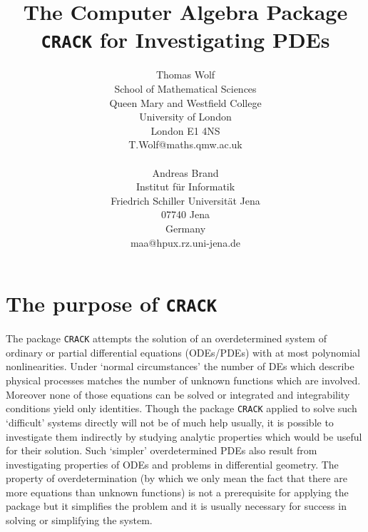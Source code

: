
\oddsidemargin 10mm  \evensidemargin 10mm
\topmargin 0pt   \headheight 0pt   \headsep 0pt
\footheight 14pt  \footskip 40pt
\textheight 23cm  \textwidth 15cm
 



\title{The Computer Algebra Package {\tt CRACK} for Investigating PDEs}
\author{Thomas Wolf \\                        
        School of Mathematical Sciences \\
        Queen Mary and Westfield College \\
        University of London \\
        London E1 4NS \\
        T.Wolf@maths.qmw.ac.uk
\\ \\
Andreas Brand \\ Institut f\"{u}r 
Informatik \\ Friedrich Schiller Universit\"{a}t Jena \\ 07740 Jena
\\ Germany \\ maa@hpux.rz.uni-jena.de
}


\maketitle
\tableofcontents                                  
\section{The purpose of {\tt CRACK}}
The package {\tt CRACK} attempts the solution of an overdetermined 
system of ordinary or partial differential
equations (ODEs/PDEs) with at most polynomial nonlinearities. 
Under `normal circumstances' the number of DEs which describe physical
processes matches the number of unknown functions which are involved.
Moreover none of those equations can be solved or integrated and
integrability conditions yield only identities.  Though the package
{\tt CRACK} applied to solve such `difficult' systems
directly will not be of much  help usually, it is possible to
investigate them indirectly by 
studying analytic properties which would be useful for their
solution. Such `simpler' overdetermined PDEs also result from
investigating properties of ODEs and problems in differential geometry.
The property of overdetermination (by which we only mean the fact
that there are more equations than unknown functions) is not a
prerequisite for applying the package but it simplifies the problem
and it is usually necessary for success in solving or simplifying the
system.

